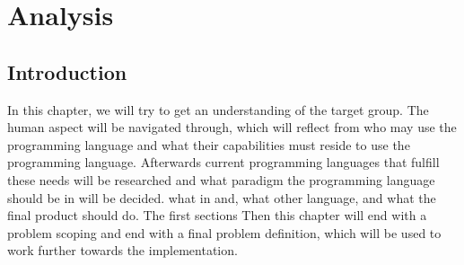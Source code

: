\chapter{Analysis}\label{ch:ch2label}
\section{Introduction}
In this chapter, we will try to get an understanding of the target group. The human aspect will be navigated through, which will reflect from who may use the programming language and what their capabilities must reside to use the programming language. Afterwards current programming languages that fulfill these needs will be researched and what paradigm the programming language should be in will be decided. what in and, what other language, and what the final product should do. The first sections  Then this chapter will end with a problem scoping and end with a final problem definition, which will be used to work further towards the implementation.